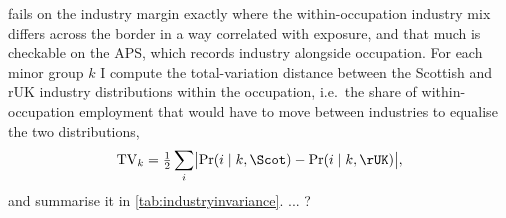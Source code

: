  fails on the industry margin exactly where the within-occupation industry mix differs across the border in a way correlated with exposure, and that much is checkable on the APS, which records industry alongside occupation. For each minor group $k$ I compute the total-variation distance between the Scottish and rUK industry distributions within the occupation, i.e.\ the share of within-occupation employment that would have to move between industries to equalise the two distributions,
\begin{equation*}
\mathrm{TV}_k = \tfrac{1}{2} \sum_i \bigl| \Pr(i \mid k, \Scot)
- \Pr(i \mid k, \rUK) \bigr|,
\end{equation*}
and summarise it in \cref{tab:industryinvariance}. ... ?
 
